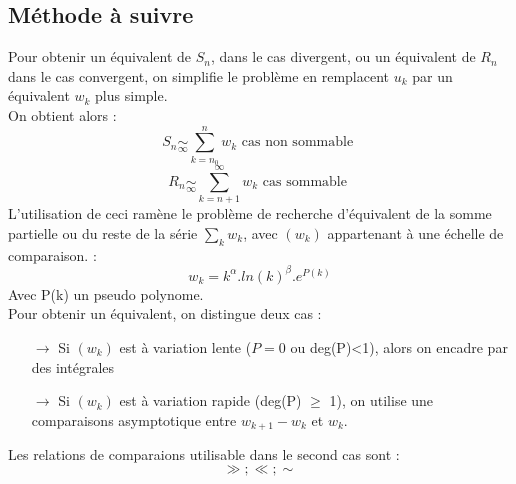 \subsection{Méthode à suivre}
Pour obtenir un équivalent de $S_n$, dans le cas divergent, ou un équivalent de $R_n$ dans le cas convergent, on simplifie le problème en remplacent $u_k$ par un équivalent $w_k$ plus simple.\\
On obtient alors : 
$$S_n \underset{\infty}\sim \sum_{k=n_0}^n w_k \mbox{ cas non sommable }$$
$$R_n \underset{\infty}\sim \sum_{k=n+1}^{\infty} w_k \mbox{ cas sommable }$$
L'utilisation de ceci ramène le problème de recherche d'équivalent de la somme partielle ou du reste de la série $\underset{k}\sum w_k$, avec $(w_k)$ appartenant à une échelle de comparaison. : 
$$w_k = k^{\alpha}.ln(k)^{\beta}.e^{P(k)}$$
Avec P(k) un pseudo polynome.\\
Pour obtenir un équivalent, on distingue deux cas : 
\begin{itemize}
 \item[$\rightarrow$] Si $(w_k)$ est à variation lente ($P = 0$ ou deg(P)<1), alors on encadre par des intégrales
 \item[$\rightarrow$] Si $(w_k)$ est à variation rapide (deg(P) $\geq$ 1), on utilise une comparaisons asymptotique entre $w_{k+1}-w_k$ et $w_k$.
\end{itemize}
Les relations de comparaions utilisable dans le second cas sont : 
$$\gg;\ll;\sim$$